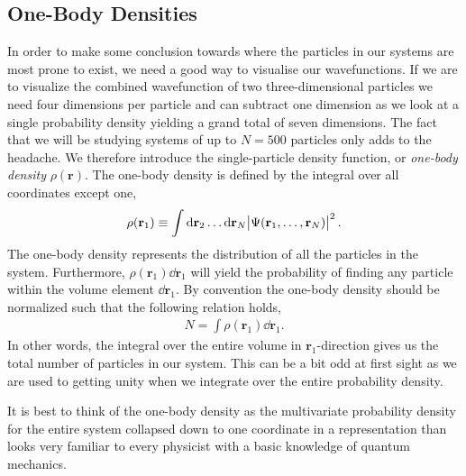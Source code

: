 \documentclass[
    a4paper, aps, twocolumn, floatfix, superscriptaddress,
    nofootinbib]{revtex4-1}
\newcommand{\vf}{\mathbf}
\newcommand{\1}{\mathds{1}}
\begin{document}
    \subsection{One-Body Densities}
        In order to make some conclusion towards where the particles in our
        systems are most prone to exist, we need a good way to visualise our
        wavefunctions. If we are to visualize the combined wavefunction of two
        three-dimensional particles we need four dimensions per particle and can
        subtract one dimension as we look at a single probability density
        yielding a grand total of seven dimensions. The fact that we will be
        studying systems of up to $N = 500$ particles only adds to the headache.
        We therefore introduce the single-particle density function, or
        \emph{one-body density} $\rho(\vf{r})$. The one-body density is defined
        by the integral over all coordinates except one,
        \begin{align}
            \rho(\vf{r}_1)
            \equiv
            \int \dd\vf{r}_2 \dots \dd\vf{r}_N
            \abs{\Psi(\vf{r}_1, \dots, \vf{r}_N)}^2.
        \end{align}
        The one-body density represents the distribution of all the particles in
        the system. Furthermore, $\rho(\vf{r}_1)\dd\vf{r}_1$ will yield the
        probability of finding any particle within the volume element
        $\dd\vf{r}_1$. By convention the one-body density should be normalized
        such that the following relation holds,
        \begin{align}
            N = \int \rho(\vf{r}_1)\dd\vf{r}_1.
        \end{align}
        In other words, the integral over the entire volume in
        $\vf{r}_1$-direction gives us the total number of particles in our
        system. This can be a bit odd at first sight as we are used to getting
        unity when we integrate over the entire probability
        density.\cite{hogberget2013quantum}

        It is best to think of the one-body density as the multivariate
        probability density for the entire system collapsed down to one
        coordinate in a representation than looks very familiar to every
        physicist with a basic knowledge of quantum mechanics.
\end{document}
